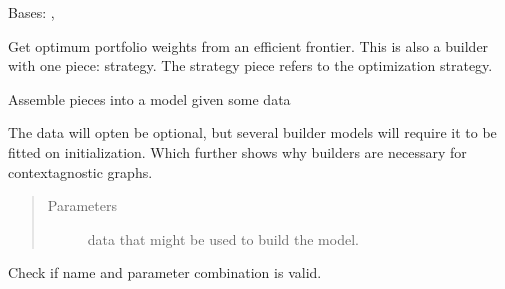 \documentclass[letterpaper,10pt,english]{sphinxmanual}
\begin{document}

\begin{fulllineitems}
\label{\detokenize{dalio.model:dalio.model.financial.OptimumWeights}}
Bases: {\hyperref[\detokenize{dalio.model:dalio.model.financial.MakeEfficientFrontier}]{}}, 

Get optimum portfolio weights from an efficient frontier.
This is also a builder with one piece: strategy. The strategy piece
refers to the optimization strategy.

\begin{fulllineitems}
\label{\detokenize{dalio.model:dalio.model.financial.OptimumWeights.build_model}}
Assemble pieces into a model given some data

The data will opten be optional, but several builder models will
require it to be fitted on initialization. Which further shows why
builders are necessary for context\sphinxhyphen{}agnostic graphs.
\begin{quote}\begin{description}
\item[{Parameters}] \leavevmode
{} \textendash{} data that might be used to build the model.

\end{description}\end{quote}

\end{fulllineitems}


\begin{fulllineitems}
\label{\detokenize{dalio.model:dalio.model.financial.OptimumWeights.check_name}}
Check if name and parameter combination is valid.


\end{fulllineitems}
\end{fulllineitems}
\end{document}
